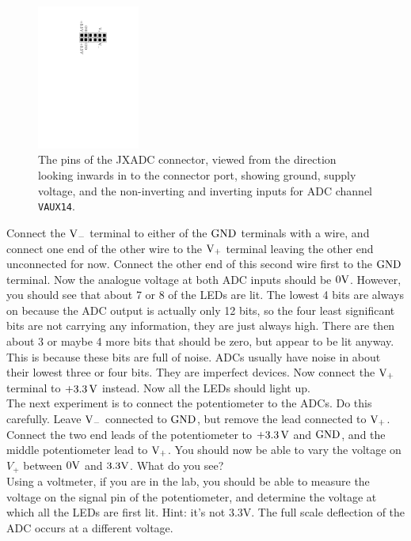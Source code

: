 \documentclass[../physical_computing.tex]{subfiles}
\begin{document}
\begin{figure}[htbp]
    \centering
    \includegraphics[width=0.3\textwidth]{appendix_6/figures/jxadc.pdf}
    \caption{The pins of the JXADC connector, viewed from the direction looking inwards in to the connector port, showing ground, supply voltage, and the non-inverting and inverting inputs for ADC channel \texttt{VAUX14}.}
    \label{fig:jxadc}
\end{figure}

Connect the $\rm V_-$ terminal to either of the $\rm GND$ terminals with a wire, and connect one end of the other wire to the $\rm V_+$ terminal leaving the other end unconnected for now. Connect the other end of this second wire first to the $\rm GND$ terminal. Now the analogue voltage at both ADC inputs should be $\rm 0V$. However, you should see that about 7 or 8 of the LEDs are lit. The lowest 4 bits are always on because the ADC output is actually only 12 bits, so the four least significant bits are not carrying any information, they are just always high. There are then about 3 or maybe 4 more bits that should be zero, but appear to be lit anyway. This is because these bits are full of noise. ADCs usually have noise in about their lowest three or four bits. They are imperfect devices. Now connect the $\rm V_+$ terminal to $\rm +3.3\,V$ instead. Now all the LEDs should light up. \\

The next experiment is to connect the potentiometer to the ADCs. Do this carefully. Leave $\rm V_-$ connected to $\rm GND$, but remove the lead connected to $\rm V_+$. Connect the two end leads of the potentiometer to $\rm +3.3\,V$ and $\rm GND$, and the middle potentiometer lead to $\rm V_+$. You should now be able to vary the voltage on $V_+$ between $\rm 0V$ and $\rm 3.3V$. What do you see? \\

Using a voltmeter, if you are in the lab, you should be able to measure the voltage on the signal pin of the potentiometer, and determine the voltage at which all the LEDs are first lit. Hint: it's not 3.3V. The full scale deflection of the ADC occurs at a different voltage. \\
\end{document}
